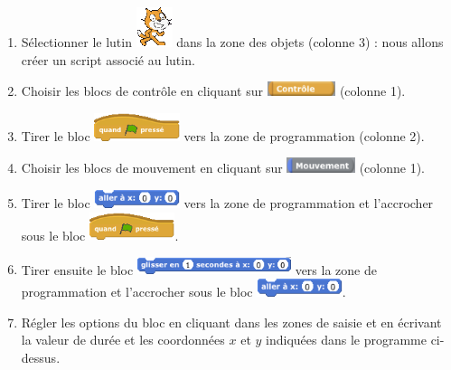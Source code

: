 
\begin{enumerate}
\item Sélectionner le lutin \includegraphics[width=.7cm]{./images/scratch/Lutin} dans la zone des objets (colonne 3) : nous allons créer un script associé au lutin.
\item Choisir les blocs de contrôle en cliquant sur \includegraphics[width=2cm]{./images/scratch/BlocsControle} (colonne 1).
\item Tirer le bloc \includegraphics[width=2.5cm]{./images/scratch/BlocDrapeauVert} vers la zone de programmation (colonne 2).
\item Choisir les blocs de mouvement en cliquant sur \includegraphics[width=2cm]{./images/scratch/BlocsMouvement} (colonne 1).
\item Tirer le bloc \includegraphics[width=2.5cm]{./images/scratch/BlocAllerA} vers la zone de programmation et l'accrocher sous le bloc \includegraphics[width=2.5cm]{./images/scratch/BlocDrapeauVert}.
\item Tirer ensuite le bloc \includegraphics[width=4.5cm]{./images/scratch/BlocGlisser} vers la zone de programmation et l'accrocher sous le bloc \includegraphics[width=2.5cm]{./images/scratch/BlocAllerA}.
\item Régler les options du bloc en cliquant dans les zones de saisie et en écrivant la valeur de durée et les coordonnées $x$ et $y$ indiquées dans le programme ci-dessus.

\end{enumerate}
